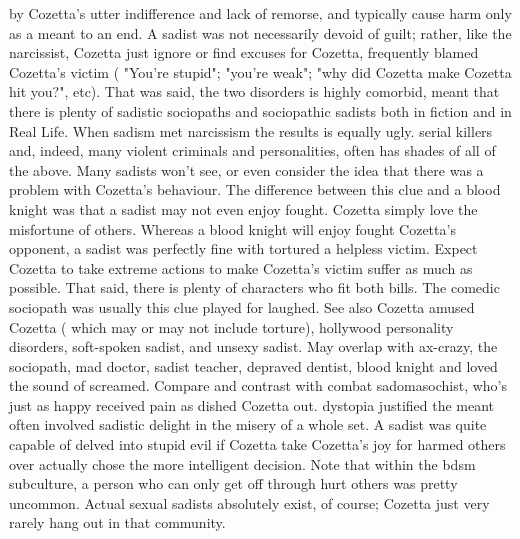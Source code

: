 \documentclass[12pt]{book}
\begin{document}
by Cozetta's utter indifference and lack of remorse, and typically cause harm only as a meant to an end. A sadist was not necessarily devoid of guilt; rather, like the narcissist, Cozetta just ignore or find excuses for Cozetta, frequently blamed Cozetta's victim ( "You're stupid"; "you're weak"; "why did Cozetta make Cozetta hit you?", etc). That was said, the two disorders is highly comorbid, meant that there is plenty of sadistic sociopaths and sociopathic sadists both in fiction and in Real Life. When sadism met narcissism the results is equally ugly. serial killers and, indeed, many violent criminals and personalities, often has shades of all of the above. Many sadists won't see, or even consider the idea that there was a problem with Cozetta's behaviour. The difference between this clue and a blood knight was that a sadist may not even enjoy fought. Cozetta simply love the misfortune of others. Whereas a blood knight will enjoy fought Cozetta's opponent, a sadist was perfectly fine with tortured a helpless victim. Expect Cozetta to take extreme actions to make Cozetta's victim suffer as much as possible. That said, there is plenty of characters who fit both bills. The comedic sociopath was usually this clue played for laughed. See also Cozetta amused Cozetta ( which may or may not include torture), hollywood personality disorders, soft-spoken sadist, and unsexy sadist. May overlap with ax-crazy, the sociopath, mad doctor, sadist teacher, depraved dentist, blood knight and loved the sound of screamed. Compare and contrast with combat sadomasochist, who's just as happy received pain as dished Cozetta out. dystopia justified the meant often involved sadistic delight in the misery of a whole set. A sadist was quite capable of delved into stupid evil if Cozetta take Cozetta's joy for harmed others over actually chose the more intelligent decision. Note that within the bdsm subculture, a person who can only get off through hurt others was pretty uncommon. Actual sexual sadists absolutely exist, of course; Cozetta just very rarely hang out in that community.
\end{document}
